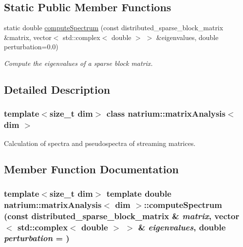 \subsection*{Static Public Member Functions}
\begin{DoxyCompactItemize}
\item 
static double \hyperlink{classnatrium_1_1matrixAnalysis_a03a05223c2dc32a674f8b3ec2f6e6659}{computeSpectrum} (const distributed\_\-sparse\_\-block\_\-matrix \&matrix, vector$<$ std::complex$<$ double $>$ $>$ \&eigenvalues, double perturbation=0.0)
\begin{DoxyCompactList}\small\item\em Compute the eigenvalues of a sparse block matrix. \item\end{DoxyCompactList}\end{DoxyCompactItemize}


\subsection{Detailed Description}
\subsubsection*{template$<$size\_\-t dim$>$ class natrium::matrixAnalysis$<$ dim $>$}

Calculation of spectra and pseudospectra of streaming matrices. 

\subsection{Member Function Documentation}
\hypertarget{classnatrium_1_1matrixAnalysis_a03a05223c2dc32a674f8b3ec2f6e6659}{
\subsubsection[{computeSpectrum}]{\setlength{\rightskip}{0pt plus 5cm}template$<$size\_\-t dim$>$ template double {\bf natrium::matrixAnalysis}$<$ dim $>$::computeSpectrum (const distributed\_\-sparse\_\-block\_\-matrix \& {\em matrix}, \/  vector$<$ std::complex$<$ double $>$ $>$ \& {\em eigenvalues}, \/  double {\em perturbation} = {})}}
\label{classnatrium_1_1matrixAnalysis_a03a05223c2dc32a674f8b3ec2f6e6659}


